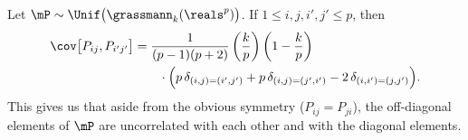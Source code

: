 \begin{lemma}\label{L:grassman-moments-2}
    Let $\mP \sim \Unif \big( \grassmann_k(\reals^p) \big)$.  If
    $1 \leq i,j,i',j' \leq p$, then
    \begin{equation*}
        \begin{split}
            \cov \big[ P_{ij}, P_{i'j'} \big]
                &=
                    \frac{1}{(p-1)(p+2)}
                    \left(
                        \frac{k}{p}
                    \right)
                    \left(
                        1 - \frac{k}{p}
                    \right) \\
                &\qquad\cdot
                    \Big(
                          p \, \delta_{(i,j ) = (i',j')}
                        + p \, \delta_{(i,j ) = (j',i')}
                        - 2 \, \delta_{(i,i') = (j ,j')}
                    \Big).
        \end{split}
    \end{equation*}
    This gives us that aside from the obvious symmetry ($P_{ij} = P_{ji}$), 
    the off-diagonal elements of $\mP$ are uncorrelated with each other and 
    with the diagonal elements.
\end{lemma}
